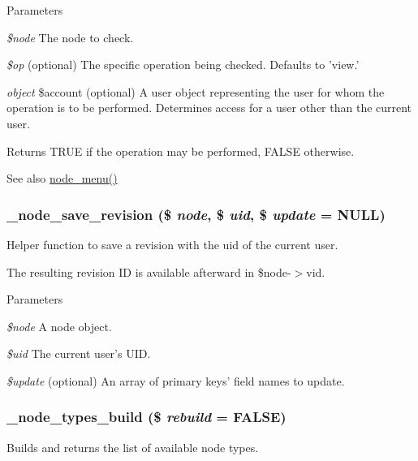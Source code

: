 \begin{DoxyParams}{Parameters}
\item[{\em \$node}]The node to check. \item[{\em \$op}](optional) The specific operation being checked. Defaults to 'view.' \item[{\em object}]\$account (optional) A user object representing the user for whom the operation is to be performed. Determines access for a user other than the current user.\end{DoxyParams}
\begin{DoxyReturn}{Returns}
TRUE if the operation may be performed, FALSE otherwise.
\end{DoxyReturn}
\begin{DoxySeeAlso}{See also}
\hyperlink{node_8module_a15e8d85a7559f22b8f2c77c1d5dfac63}{node\_\-menu()} 
\end{DoxySeeAlso}
\hypertarget{node_8module_a43bc9486bf2d8a9c4e500d8aa3b5d702}{
\subsubsection[{\_\-node\_\-save\_\-revision}]{\setlength{\rightskip}{0pt plus 5cm}\_\-node\_\-save\_\-revision (\$ {\em node}, \/  \$ {\em uid}, \/  \$ {\em update} = {\ttfamily NULL})}}
\label{node_8module_a43bc9486bf2d8a9c4e500d8aa3b5d702}
Helper function to save a revision with the uid of the current user.

The resulting revision ID is available afterward in \$node-\/$>$vid.


\begin{DoxyParams}{Parameters}
\item[{\em \$node}]A node object. \item[{\em \$uid}]The current user's UID. \item[{\em \$update}](optional) An array of primary keys' field names to update. \end{DoxyParams}
\hypertarget{node_8module_a31b891b6c1ffba98fd4478e4255e301b}{
\subsubsection[{\_\-node\_\-types\_\-build}]{\setlength{\rightskip}{0pt plus 5cm}\_\-node\_\-types\_\-build (\$ {\em rebuild} = {\ttfamily FALSE})}}
\label{node_8module_a31b891b6c1ffba98fd4478e4255e301b}
Builds and returns the list of available node types.

